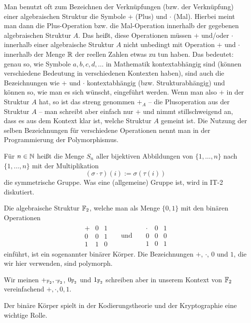\begin{bem} 
	Man benutzt oft zum Bezeichnen der Verknüpfungen (bzw. der Verknüpfung) einer algebraischen Struktur die Symbole $+$ (Plus) und $\cdot$ (Mal). Hierbei meint man dann die Plus-Operation bzw. die Mal-Operation innerhalb der gegebenen algebraischen Struktur $A$. Das heißt, diese Operationen müssen $+$ und/oder $\cdot$ innerhalb einer algebraische Struktur $A$ nicht unbedingt mit Operation $+$ und $\cdot$ innerhalb der Menge $\mathbb{R}$ der reellen Zahlen etwas zu tun haben. Das bedeutet:  genau so, wie Symbole $a,b,c,d,\ldots$ in Mathematik kontextabhängig sind (können verschiedene Bedeutung in verschiedenen Kontexten haben), sind auch die Bezeichnungen wie $+$ und $\cdot$  kontextabhängig (bzw. Strukturabhängig) und können so, wie man es sich wünscht, eingeführt werden. Wenn man also $+$ in der Struktur $A$ hat, so ist das streng genommen $+_A$ -- die Plusoperation aus der Struktur $A$ -- man schreibt aber einfach nur $+$ und nimmt stillschweigend  an, dass es aus dem Kontext klar ist, welche Struktur $A$ gemeint ist. Die Nutzung der selben Bezeichnungen für verschiedene Operationen nennt man in der Programmierung der Polymorphismus.
\end{bem} 

\begin{bsp}
	Für $n \in \mathbb{N}$ heißt die Menge $S_n$ aller bijektiven Abbildungen von $\{1,\ldots,n\}$ nach $\{1,\ldots,n\}$ mit der Multiplikation 
	\[(\sigma \cdot \tau )(i) := \sigma(\tau(i))
	\] die symmetrische Gruppe. Was eine (allgemeine) Gruppe ist, wird in IT-2 diskutiert. 
\end{bsp} 

\begin{bsp} 
	Die algebraische Struktur $\mathbb{F}_2$, welche man als Menge  $\{0,1\}$ mit den binären Operationen 
\begin{align*}
\begin{array}{c|cc}
	+ & 0 & 1 \\
	\hline 
	0 & 0 & 1 \\
	1 & 1 & 0
\end{array}
& & \text{und} & & 
\begin{array}{c|cc}
\cdot & 0 & 1 \\
\hline 
0 & 0 & 0 \\
1 & 0 & 1
\end{array}
\end{align*} 
einführt, ist ein sogenannter binärer Körper. Die Bezeichnungen $+$, $\cdot$, $0$ und $1$, die wir hier verwenden, sind polymorph. 

Wir meinen $+_{\mathbb{F}_2}, \cdot_{\mathbb{F}_2}$, $0_{\mathbb{F}_2}$ und $1_{\mathbb{F}_2}$ schreiben aber in unserem Kontext von $\mathbb{F}_2$ vereinfachend $+, \cdot, 0, 1$. 

Der binäre Körper spielt in der Kodierungstheorie und der Kryptographie eine wichtige Rolle. 

\end{bsp} 


